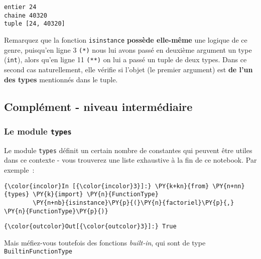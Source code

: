     \begin{Verbatim}[commandchars=\\\{\},frame=single,framerule=0.3mm,rulecolor=\color{cellframecolor}]
entier 24
chaine 40320
tuple [24, 40320]
\end{Verbatim}

    Remarquez que la fonction \texttt{isinstance} \textbf{possède elle-même}
une logique de ce genre, puisqu'en ligne 3 \texttt{(*)} nous lui avons
passé en deuxième argument un type (\texttt{int}), alors qu'en ligne 11
\texttt{(**)} on lui a passé un tuple de deux types. Dans ce second cas
naturellement, elle vérifie si l'objet (le premier argument) est
\textbf{de l'un des types} mentionnés dans le tuple.

    \hypertarget{compluxe9ment---niveau-intermuxe9diaire}{%
\subsection{Complément - niveau
intermédiaire}\label{compluxe9ment---niveau-intermuxe9diaire}}

    \hypertarget{le-module-types}{%
\subsubsection{\texorpdfstring{Le module
\texttt{types}}{Le module types}}\label{le-module-types}}

    Le module \texttt{types} définit un certain nombre de constantes qui
peuvent être utiles dans ce contexte - vous trouverez une liste
exhaustive à la fin de ce notebook. Par exemple~:

    \begin{Verbatim}[commandchars=\\\{\},frame=single,framerule=0.3mm,rulecolor=\color{cellframecolor}]
{\color{incolor}In [{\color{incolor}3}]:} \PY{k+kn}{from} \PY{n+nn}{types} \PY{k}{import} \PY{n}{FunctionType}
        \PY{n+nb}{isinstance}\PY{p}{(}\PY{n}{factoriel}\PY{p}{,} \PY{n}{FunctionType}\PY{p}{)}
\end{Verbatim}


\begin{Verbatim}[commandchars=\\\{\},frame=single,framerule=0.3mm,rulecolor=\color{cellframecolor}]
{\color{outcolor}Out[{\color{outcolor}3}]:} True
\end{Verbatim}
            
    Mais méfiez-vous toutefois des fonctions \emph{built-in}, qui sont de
type \texttt{BuiltinFunctionType}


